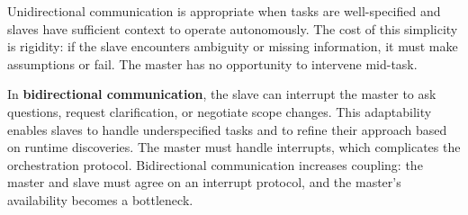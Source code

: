 Unidirectional communication is appropriate when tasks are well-specified and slaves have sufficient context to operate autonomously. The cost of this simplicity is rigidity: if the slave encounters ambiguity or missing information, it must make assumptions or fail. The master has no opportunity to intervene mid-task.

In \textbf{bidirectional communication}, the slave can interrupt the master to ask questions, request clarification, or negotiate scope changes. This adaptability enables slaves to handle underspecified tasks and to refine their approach based on runtime discoveries. The master must handle interrupts, which complicates the orchestration protocol. Bidirectional communication increases coupling: the master and slave must agree on an interrupt protocol, and the master's availability becomes a bottleneck.

